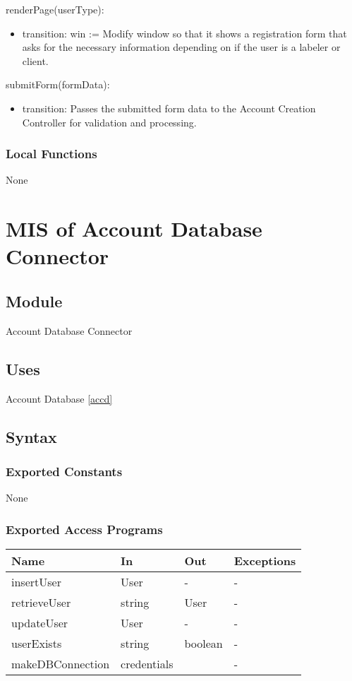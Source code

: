 \documentclass[12pt, titlepage]{article}
\begin{document}
\noindent renderPage(userType):
\begin{itemize}
\item transition: win := Modify window so that it shows a registration form that asks for the necessary information depending on if the user is a labeler or client.
\end{itemize}

\noindent submitForm(formData):
\begin{itemize}
\item transition: Passes the submitted form data to the Account Creation Controller for validation and processing.
\end{itemize}

\subsubsection{Local Functions}
None

\section{MIS of Account Database Connector} \label{accdc}

\subsection{Module}

Account Database Connector

\subsection{Uses}

Account Database \ref{accd}

\subsection{Syntax}

\subsubsection{Exported Constants}
None
\subsubsection{Exported Access Programs}

\begin{center}
\begin{tabular}{p{2cm} p{4cm} p{4cm} p{2cm}}
\hline
\textbf{Name} & \textbf{In} & \textbf{Out} & \textbf{Exceptions} \\
\hline
insertUser & User & - & - \\
retrieveUser & string & User & - \\
updateUser & User & - & - \\
userExists & string & boolean & - \\
makeDBConnection & credentials & & - \\
\hline
\end{tabular}
\end{center}
\end{document}
